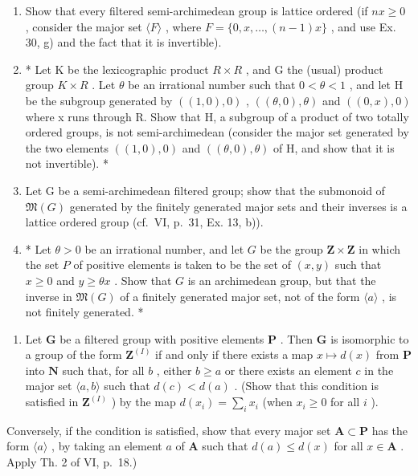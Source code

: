 \begin{enumerate}
\def\labelenumi{\alph{enumi})}
\item
  Show that every filtered semi-archimedean group is lattice ordered (if \(nx \geqslant 0\) , consider the major set \(\langle F \rangle\) , where \(F = \{0, x, \ldots, (n - 1)x\}\) , and use Ex. 30, g) and the fact that it is invertible).
\item
  * Let K be the lexicographic product \(R \times R\) , and G the (usual) product group \(K \times R\) . Let \(\theta\) be an irrational number such that \(0 < \theta < 1\) , and let H be the subgroup generated by \(((1, 0), 0)\) , \(((\theta, 0), \theta)\) and \(((0, x), 0)\) where x runs through R. Show that H, a subgroup of a product of two totally ordered groups, is not semi-archimedean (consider the major set generated by the two elements \(((1,0),0)\) and \(((\theta ,0),\theta)\) of H, and show that it is not invertible). *
\item
  Let G be a semi-archimedean filtered group; show that the submonoid of \(\mathfrak{M}(G)\) generated by the finitely generated major sets and their inverses is a lattice ordered group (cf.~VI, p.~31, Ex. 13, b)).
\item
  * Let \(\theta > 0\) be an irrational number, and let \(G\) be the group \(\mathbf{Z} \times \mathbf{Z}\) in which the set \(P\) of positive elements is taken to be the set of \((x, y)\) such that \(x \geqslant 0\) and \(y \geqslant \theta x\) . Show that \(G\) is an archimedean group, but that the inverse in \(\mathfrak{M}(G)\) of a finitely generated major set, not of the form \(\langle a \rangle\) , is not finitely generated. *
\end{enumerate}

\begin{enumerate}
\def\labelenumi{\arabic{enumi})}
\setcounter{enumi}{35}
\tightlist
\item
  Let \(\mathbf{G}\) be a filtered group with positive elements \(\mathbf{P}\) . Then \(\mathbf{G}\) is isomorphic to a group of the form \(\mathbf{Z}^{(I)}\) if and only if there exists a map \(x \mapsto d(x)\) from \(\mathbf{P}\) into \(\mathbf{N}\) such that, for all \(b\) , either \(b \geqslant a\) or there exists an element \(c\) in the major set \(\langle a, b \rangle\) such that \(d(c) < d(a)\) . (Show that this condition is satisfied in \(\mathbf{Z}^{(I)}\) ) by the map \(d(x_{i}) = \sum_{i} x_{i}\) (when \(x_{i} \geqslant 0\) for all \(i\) ).
\end{enumerate}

Conversely, if the condition is satisfied, show that every major set \(\mathbf{A} \subset \mathbf{P}\) has the form \(\langle a \rangle\) , by taking an element \(a\) of \(\mathbf{A}\) such that \(d(a) \leqslant d(x)\) for all \(x \in \mathbf{A}\) . Apply Th. 2 of VI, p.~18.)
\relax{}
